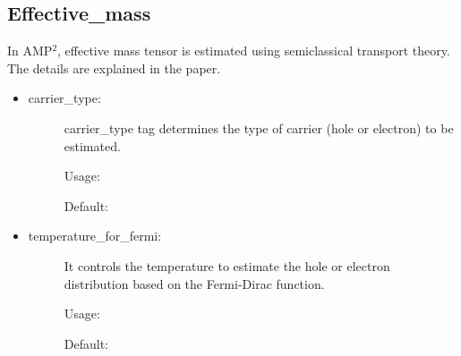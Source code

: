 \documentclass[letterpaper,10pt,english]{sphinxmanual}
\begin{document}
\subsection{Effective\_mass}
\label{\detokenize{Input/Configuration:effective-mass}}
In AMP$^{\text{2}}$, effective mass tensor is estimated using semiclassical transport theory.
The details are explained in the paper.
\begin{itemize}
\item {} \begin{description}
\item[{carrier\_type:}] \leavevmode
carrier\_type tag determines the type of carrier (hole or electron) to be estimated.

Usage:

\begin{sphinxVerbatim}[commandchars=\\\{\}]
       
\end{sphinxVerbatim}

Default:

\begin{sphinxVerbatim}[commandchars=\\\{\}]
     
     
\end{sphinxVerbatim}

\end{description}

\item {} \begin{description}
\item[{temperature\_for\_fermi:}] \leavevmode
It controls the temperature to estimate the hole or electron distribution
based on the Fermi-Dirac function.

Usage:

\begin{sphinxVerbatim}[commandchars=\\\{\}]
   \PYG{p}{[}\PYG{p}{]}
\end{sphinxVerbatim}

Default:

\begin{sphinxVerbatim}[commandchars=\\\{\}]
   
\end{sphinxVerbatim}

\end{description}

\end{itemize}
\end{document}
